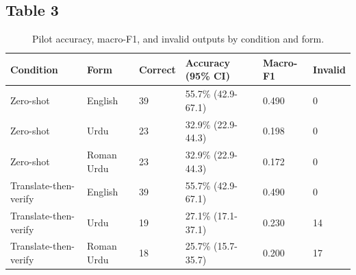 \documentclass[10pt,a4paper]{article}
\begin{document}
\subsection{Table 3}
\begin{table}[t]
\centering
\scriptsize
\begin{tabular}{llllll}
\toprule
Condition & Form & Correct & Accuracy (95\% CI) & Macro-F1 & Invalid \\
\midrule
Zero-shot & English & 39 & 55.7\% (42.9-67.1) & 0.490 & 0 \\
Zero-shot & Urdu & 23 & 32.9\% (22.9-44.3) & 0.198 & 0 \\
Zero-shot & Roman Urdu & 23 & 32.9\% (22.9-44.3) & 0.172 & 0 \\
Translate-then-verify & English & 39 & 55.7\% (42.9-67.1) & 0.490 & 0 \\
Translate-then-verify & Urdu & 19 & 27.1\% (17.1-37.1) & 0.230 & 14 \\
Translate-then-verify & Roman Urdu & 18 & 25.7\% (15.7-35.7) & 0.200 & 17 \\
\bottomrule
\end{tabular}
\caption{Pilot accuracy, macro-F1, and invalid outputs by condition and form.}
\end{table}
\end{document}
